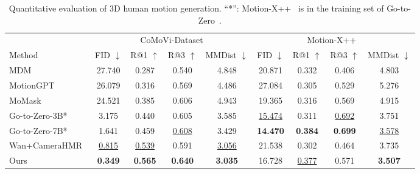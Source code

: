 \begin{table}[t!]
    \centering
    \scriptsize
    \setlength{\tabcolsep}{2.4pt}
    \begin{tabular}{lcccccccc}
        \toprule
        & \multicolumn{4}{c}{CoMoVi-Dataset} & \multicolumn{4}{c}{Motion-X++~\cite{lin2023motionx}}\\
        \cmidrule(lr){2-5} \cmidrule(lr){6-9}
        Method & FID $\downarrow$ & R@1 $\uparrow$ & R@3 $\uparrow$ & MMDist $\downarrow$ & FID $\downarrow$ & R@1 $\uparrow$ & R@3 $\uparrow$ & MMDist $\downarrow$ \\
        \midrule
        MDM~\cite{tevet2022mdm}                                 & 27.740 & 0.287 & 0.540 & 4.848 & 20.871 & 0.332 & 0.406 & 4.803 \\
        MotionGPT~\cite{jiang2023motiongpt}                     & 26.079 & 0.316 & 0.569 & 4.486 & 27.084 & 0.305 & 0.529 & 5.276 \\
        MoMask~\cite{guo2024momask}                             & 24.521 & 0.385 & 0.606 & 4.943 & 19.365 & 0.316 & 0.569 & 4.915 \\
        Go-to-Zero-3B*~\cite{fan2025gotozero}                   & 3.175  & 0.440 & 0.605 & 3.585 & \underline{15.474} & 0.311 & \underline{0.692} & 3.751 \\
        Go-to-Zero-7B*~\cite{fan2025gotozero}                   & 1.641  & 0.459 & \underline{0.608} & 3.429 & \textbf{14.470} & \textbf{0.384} & \textbf{0.699} & \underline{3.578} \\
        Wan+CameraHMR~\cite{wan2025wan,patel2025camerahmr}      & \underline{0.815} & \underline{0.539} & 0.591 & \underline{3.056} & 21.538 & 0.302 & 0.464 & 3.735 \\
        \cellcolor{lightgray!30}Ours                                                    & \cellcolor{lightgray!30}\textbf{0.349} & \cellcolor{lightgray!30}\textbf{0.565} & \cellcolor{lightgray!30}\textbf{0.640} & \cellcolor{lightgray!30}\textbf{3.035} & \cellcolor{lightgray!30}16.728 & \cellcolor{lightgray!30}\underline{0.377} & \cellcolor{lightgray!30}0.571 & \cellcolor{lightgray!30}\textbf{3.507} \\
        \bottomrule
    \end{tabular}
    \vspace{2pt}
    \caption{Quantitative evaluation of 3D human motion generation. ``*'': Motion-X++~\cite{lin2023motionx} is in the training set of Go-to-Zero~\cite{fan2025gotozero}.}
    \label{tab:mogen}
\vspace{-25pt}
\end{table}

